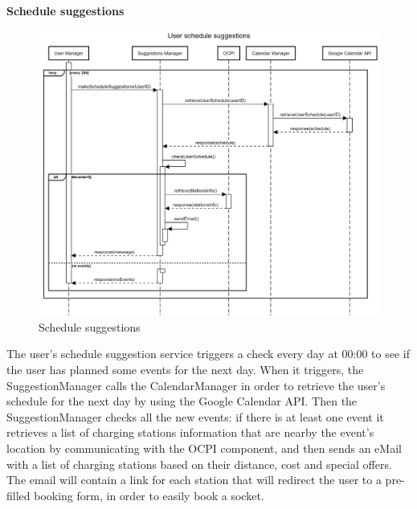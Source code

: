 \documentclass[table, 12pt]{article}
\begin{document}
\newpage
\textbf{Schedule suggestions}
\begin{center}
    \begin{figure}[H]
        \includegraphics[scale=0.20, center]{assets/sequenceDiagrams/User schedule suggestions.png}
        \caption{Schedule suggestions}
        \label{Schedule suggestions}
    \end{figure}
\end{center}
\newpage
The user's schedule suggestion service triggers a check every day at 00:00 to see if the user has planned some events for the next day.
When it triggers, the SuggestionManager calls the CalendarManager in order to retrieve the user's schedule for the next day by using the Google Calendar API.
Then the SuggestionManager checks all the new events: if there is at least one event it retrieves a list of charging stations information that are nearby the event's location by communicating with the OCPI component, and then sends an eMail with a list of charging stations based on their distance, cost and special offers.
The email will contain a link for each station that will redirect the user to a pre-filled booking form, in order to easily book a socket.
\newpage
\end{document}
